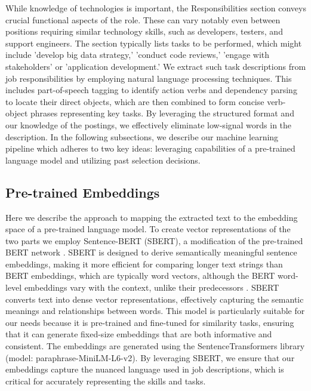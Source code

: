 \documentclass[12pt]{article}
\begin{document}
While knowledge of technologies is important, the Responsibilities section conveys crucial functional aspects of the role. These can vary notably even between positions requiring similar technology skills, such as developers, testers, and support engineers. The section typically lists tasks to be performed, which might include 'develop big data strategy,' 'conduct code reviews,' 'engage with stakeholders' or 'application development.' We extract such task descriptions from job responsibilities by employing natural language processing techniques. This includes part-of-speech tagging to identify action verbs and dependency parsing to locate their direct objects, which are then combined to form concise verb-object phrases representing key tasks. By leveraging the structured format and our knowledge of the postings, we effectively eliminate low-signal words in the description. In the following subsections, we describe our machine learning pipeline which adheres to two key ideas: leveraging capabilities of a pre-trained language model and utilizing past selection decisions. 

\subsection{Pre-trained Embeddings}

Here we describe the approach to mapping the extracted text to the embedding space of a pre-trained language model. To create vector representations of the two parts we employ Sentence-BERT (SBERT), a modification of the pre-trained BERT network \autocite{devlin2018bert}. SBERT is designed to derive semantically meaningful sentence embeddings, making it more efficient for comparing longer text strings than BERT embeddings, which are typically word vectors, although the BERT word-level embeddings vary with the context, unlike their predecessors \autocite{reimers-2019-sentence-bert}. SBERT converts text into dense vector representations, effectively capturing the semantic meanings and relationships between words. This model is particularly suitable for our needs because it is pre-trained and fine-tuned for similarity tasks, ensuring that it can generate fixed-size embeddings that are both informative and consistent. The embeddings are generated using the SentenceTransformers library (model: paraphrase-MiniLM-L6-v2). By leveraging SBERT, we ensure that our embeddings capture the nuanced language used in job descriptions, which is critical for accurately representing the skills and tasks. 
\end{document}
